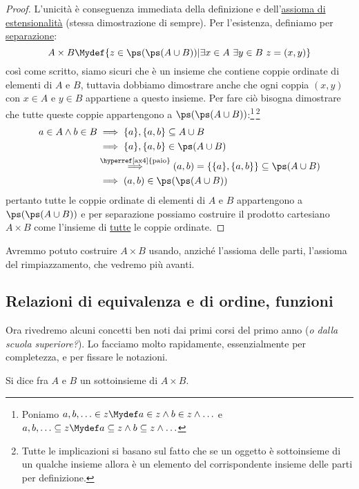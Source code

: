 \documentclass[11pt]{scrartcl}
\begin{document}
\begin{proof}
	L'unicità è conseguenza immediata della definizione e dell'\hyperref[ax2]{assioma di estensionalità} (stessa dimostrazione di sempre). Per l'esistenza, definiamo per \hyperref[ax3]{separazione}:
	\[ A \times B \Mydef \{z \in \ps(\ps(A \cup B)) | \exists x \in A \ \exists y \in B \ z = (x,y)\}
		\]
	così come scritto, siamo sicuri che è un insieme che contiene coppie ordinate di elementi di $A$ e $B$, tuttavia dobbiamo dimostrare anche che ogni coppia $(x,y)$ con $x \in A$ e $y \in B$ appartiene a questo insieme. Per fare ciò bisogna dimostrare che tutte queste coppie
	appartengono a $\ps(\ps(A \cup B))$:\footnote{Poniamo $a,b,\ldots \in z \Mydef a \in z \land b \in z \land \ldots$ e $a,b,\ldots \subseteq z \Mydef a \subseteq z \land b \subseteq z \land \ldots$}\,\footnote{Tutte le implicazioni si basano sul fatto che se un oggetto è sottoinsieme di un qualche insieme allora è un elemento del corrispondente insieme delle parti per definizione.}
	\[\begin{split}
		a \in A \land b \in B &\implies \{a\},\{a,b\} \subseteq A \cup B \\
		& \implies \{a\},\{a,b\} \in \ps(A \cup B) \\
		& \overset{\text{\hyperref[ax4]{paio}}}{\implies} (a,b) = \{\{a\},\{a,b\}\} \subseteq \ps(A \cup B)\\
		& \implies (a,b) \in \ps(\ps(A \cup B))
	\end{split}
		\]
	pertanto tutte le coppie ordinate di elementi di $A$ e $B$ appartengono a $\ps(\ps(A \cup B))$ e per separazione possiamo costruire il prodotto cartesiano $A \times B$ come l'insieme di \underline{tutte} le coppie ordinate.
\end{proof}

\begin{note}
	Avremmo potuto costruire $A \times B$ usando, anziché l'assioma delle parti, l'assioma del rimpiazzamento, che vedremo più avanti.
\end{note}

\subsection{Relazioni di equivalenza e di ordine, funzioni}
Ora rivedremo alcuni concetti ben noti dai primi corsi del primo anno (\emph{o dalla scuola superiore?}). Lo facciamo molto rapidamente, essenzialmente per completezza, e per fissare le notazioni.

\begin{definition}
	Si dice  fra $A$ e $B$ un sottoinsieme di $A \times B$.
\end{definition}
\end{document}
